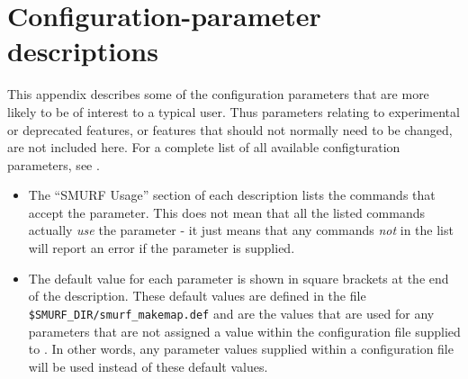 \chapter{Configuration-parameter descriptions}
\label{app:parameters}

This appendix describes some of the \makemap configuration parameters
that are more likely to be of interest to a typical user. Thus parameters
relating to experimental or deprecated features, or features that should
not normally need to be changed, are not included here. For a complete list
of all available configturation parameters, see
.

\begin{itemize}
\item The ``SMURF Usage'' section of each description lists the \SMURF
commands that accept the parameter. This does not mean that all the
listed commands actually \emph{use} the parameter - it just means that
any commands \emph{not} in the list will report an error if the parameter
is supplied.
\item The default value for each parameter is shown in square brackets at
the end of the description. These default values are defined in the file
\texttt{\$SMURF\_DIR/smurf\_makemap.def} and are the values that are used
for any parameters that are not assigned a value within the configuration
file supplied to \makemap. In other words, any parameter values supplied
within a configuration file will be used instead of these default values.
\end{itemize}

\sstminitoc{}
\sstnomaintoc

\sstmaintoc

